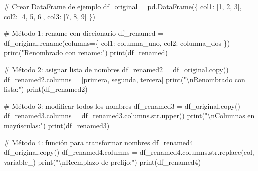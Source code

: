 \documentclass[
  doc,
  floatsintext,
  longtable,
  a4paper,
  nolmodern,
  notxfonts,
  notimes,
  12pt,
  colorlinks=true,linkcolor=blue,citecolor=blue,urlcolor=blue]{apa7}
\newenvironment{Shaded}{\begin{snugshade}}{\end{snugshade}}
\newcommand{\BuiltInTok}[1]{\textcolor[rgb]{0.00,0.23,0.31}{#1}}
\newcommand{\CharTok}[1]{\textcolor[rgb]{0.13,0.47,0.30}{#1}}
\newcommand{\CommentTok}[1]{\textcolor[rgb]{0.37,0.37,0.37}{#1}}
\newcommand{\DecValTok}[1]{\textcolor[rgb]{0.68,0.00,0.00}{#1}}
\newcommand{\NormalTok}[1]{\textcolor[rgb]{0.00,0.23,0.31}{#1}}
\newcommand{\OperatorTok}[1]{\textcolor[rgb]{0.37,0.37,0.37}{#1}}
\newcommand{\StringTok}[1]{\textcolor[rgb]{0.13,0.47,0.30}{#1}}
\begin{document}
\begin{Shaded}
\begin{Highlighting}[]
\CommentTok{\# Crear DataFrame de ejemplo}
\NormalTok{df\_original }\OperatorTok{=}\NormalTok{ pd.DataFrame(\{}
    \StringTok{\textquotesingle{}col1\textquotesingle{}}\NormalTok{: [}\DecValTok{1}\NormalTok{, }\DecValTok{2}\NormalTok{, }\DecValTok{3}\NormalTok{],}
    \StringTok{\textquotesingle{}col2\textquotesingle{}}\NormalTok{: [}\DecValTok{4}\NormalTok{, }\DecValTok{5}\NormalTok{, }\DecValTok{6}\NormalTok{],}
    \StringTok{\textquotesingle{}col3\textquotesingle{}}\NormalTok{: [}\DecValTok{7}\NormalTok{, }\DecValTok{8}\NormalTok{, }\DecValTok{9}\NormalTok{]}
\NormalTok{\})}

\CommentTok{\# Método 1: rename con diccionario}
\NormalTok{df\_renamed }\OperatorTok{=}\NormalTok{ df\_original.rename(columns}\OperatorTok{=}\NormalTok{\{}
    \StringTok{\textquotesingle{}col1\textquotesingle{}}\NormalTok{: }\StringTok{\textquotesingle{}columna\_uno\textquotesingle{}}\NormalTok{,}
    \StringTok{\textquotesingle{}col2\textquotesingle{}}\NormalTok{: }\StringTok{\textquotesingle{}columna\_dos\textquotesingle{}}
\NormalTok{\})}
\BuiltInTok{print}\NormalTok{(}\StringTok{"Renombrado con rename:"}\NormalTok{)}
\BuiltInTok{print}\NormalTok{(df\_renamed)}

\CommentTok{\# Método 2: asignar lista de nombres}
\NormalTok{df\_renamed2 }\OperatorTok{=}\NormalTok{ df\_original.copy()}
\NormalTok{df\_renamed2.columns }\OperatorTok{=}\NormalTok{ [}\StringTok{\textquotesingle{}primera\textquotesingle{}}\NormalTok{, }\StringTok{\textquotesingle{}segunda\textquotesingle{}}\NormalTok{, }\StringTok{\textquotesingle{}tercera\textquotesingle{}}\NormalTok{]}
\BuiltInTok{print}\NormalTok{(}\StringTok{"}\CharTok{\textbackslash{}n}\StringTok{Renombrado con lista:"}\NormalTok{)}
\BuiltInTok{print}\NormalTok{(df\_renamed2)}

\CommentTok{\# Método 3: modificar todos los nombres}
\NormalTok{df\_renamed3 }\OperatorTok{=}\NormalTok{ df\_original.copy()}
\NormalTok{df\_renamed3.columns }\OperatorTok{=}\NormalTok{ df\_renamed3.columns.}\BuiltInTok{str}\NormalTok{.upper()}
\BuiltInTok{print}\NormalTok{(}\StringTok{"}\CharTok{\textbackslash{}n}\StringTok{Columnas en mayúsculas:"}\NormalTok{)}
\BuiltInTok{print}\NormalTok{(df\_renamed3)}

\CommentTok{\# Método 4: función para transformar nombres}
\NormalTok{df\_renamed4 }\OperatorTok{=}\NormalTok{ df\_original.copy()}
\NormalTok{df\_renamed4.columns }\OperatorTok{=}\NormalTok{ df\_renamed4.columns.}\BuiltInTok{str}\NormalTok{.replace(}\StringTok{\textquotesingle{}col\textquotesingle{}}\NormalTok{, }\StringTok{\textquotesingle{}variable\_\textquotesingle{}}\NormalTok{)}
\BuiltInTok{print}\NormalTok{(}\StringTok{"}\CharTok{\textbackslash{}n}\StringTok{Reemplazo de prefijo:"}\NormalTok{)}
\BuiltInTok{print}\NormalTok{(df\_renamed4)}
\end{Highlighting}
\end{Shaded}
\end{document}
